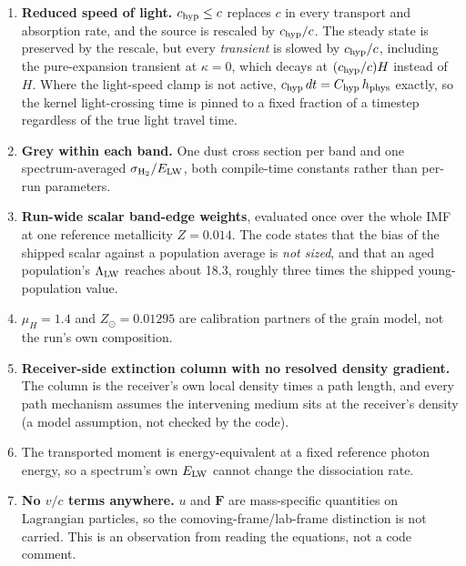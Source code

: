 \begin{enumerate}
  \item \textbf{Reduced speed of light.} $c_{\rm hyp} \le c$ replaces $c$ in
    every transport and absorption rate, and the source is rescaled by
    $c_{\rm hyp}/c$. The steady state is
    preserved by the rescale, but every \emph{transient} is slowed by
    $c_{\rm hyp}/c$, including the pure-expansion transient at $\kappa = 0$,
    which decays at $(c_{\rm hyp}/c)H$ instead of $H$. Where the light-speed
    clamp is not
    active, $c_{\rm hyp}\, dt = C_{\rm hyp}\, h_{\rm phys}$ exactly, so the
    kernel light-crossing time is pinned to a fixed fraction of a timestep
    regardless of the true light travel time.
  \item \textbf{Grey within each band.} One dust cross section per band
    and one spectrum-averaged
    $\sigma_{\rm H_2}/E_{\rm LW}$, both compile-time
    constants rather than per-run parameters.
  \item \textbf{Run-wide scalar band-edge weights}, evaluated once over the
    whole IMF at one reference metallicity $Z = 0.014$. The code states that
    the bias of the
    shipped scalar against a population average is \emph{not sized}, and that
    an aged population's
    $\Lambda_{\rm LW}$ reaches about 18.3, roughly three times the shipped
    young-population value.
  \item $\mu_H = 1.4$ and $Z_\odot = 0.01295$ are calibration partners of the
    grain model, not the run's own composition.
  \item \textbf{Receiver-side extinction column with no resolved density
    gradient.} The column is the receiver's own local density times a path
    length, and every path mechanism
    assumes the intervening medium sits at the receiver's density (a model
    assumption, not checked by the code).
  \item The transported  moment is energy-equivalent at a fixed
    reference photon energy, so a spectrum's
    own $E_{\rm LW}$ cannot change the dissociation rate.
  \item \textbf{No $v/c$ terms anywhere.} $u$ and $\boldsymbol{F}$ are
    mass-specific quantities on Lagrangian particles, so the
    comoving-frame/lab-frame distinction is not carried. This is an observation
    from reading the equations, not a code comment.
\end{enumerate}

